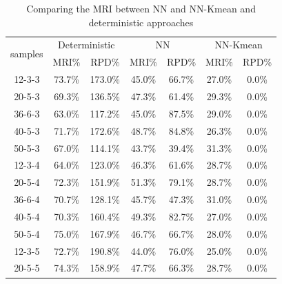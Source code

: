 \documentclass[letterpaper]{article} %
\begin{document}
\begin{table}[t]
\scriptsize
\caption{Comparing the MRI between NN and NN-Kmean and deterministic approaches}\smallskip
\centering
\smallskip\begin{tabular}{ccccccc}
\hline
\multirow{2}{*}{samples} & \multicolumn{2}{c}{Deterministic}  & \multicolumn{2}{c}{NN}           & \multicolumn{2}{c}{NN-Kmean}    \\ \cline{2-7} 
                         & MRI\%           & RPD\%            & MRI\%           & RPD\%           & MRI\%           & RPD\%          \\ \hline
12-3-3                   & 73.7\%          & 173.0\%          & 45.0\%          & 66.7\%          & 27.0\%          & 0.0\%          \\
20-5-3                   & 69.3\%          & 136.5\%          & 47.3\%          & 61.4\%          & 29.3\%          & 0.0\%          \\
36-6-3                   & 63.0\%          & 117.2\%          & 45.0\%          & 87.5\%          & 29.0\%          & 0.0\%          \\
40-5-3                   & 71.7\%          & 172.6\%          & 48.7\%          & 84.8\%          & 26.3\%          & 0.0\%          \\
50-5-3                   & 67.0\%          & 114.1\%          & 43.7\%          & 39.4\%          & 31.3\%          & 0.0\%          \\ \hline
12-3-4                   & 64.0\%          & 123.0\%          & 46.3\%          & 61.6\%          & 28.7\%          & 0.0\%          \\
20-5-4                   & 72.3\%          & 151.9\%          & 51.3\%          & 79.1\%          & 28.7\%          & 0.0\%          \\
36-6-4                   & 70.7\%          & 128.1\%          & 45.7\%          & 47.3\%          & 31.0\%          & 0.0\%          \\
40-5-4                   & 70.3\%          & 160.4\%          & 49.3\%          & 82.7\%          & 27.0\%          & 0.0\%          \\
50-5-4                   & 75.0\%          & 167.9\%          & 46.7\%          & 66.7\%          & 28.0\%          & 0.0\%          \\ \hline
12-3-5                   & 72.7\%          & 190.8\%          & 44.0\%          & 76.0\%          & 25.0\%          & 0.0\%          \\
20-5-5                   & 74.3\%          & 158.9\%          & 47.7\%          & 66.3\%          & 28.7\%          & 0.0\%          \\

\end{tabular}
\end{table}
\end{document}
